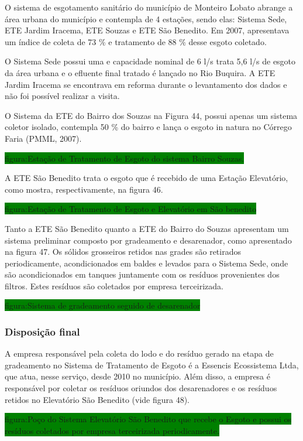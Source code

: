 	O sistema de esgotamento sanitário do município de Monteiro Lobato abrange a área urbana do município e contempla de 4 estações, sendo elas: Sistema Sede, ETE Jardim Iracema, ETE Souzas e ETE São Benedito. Em 2007, apresentava um índice de coleta de 73 \% e tratamento de 88 \% desse esgoto coletado. 

	O Sistema Sede possui uma e capacidade nominal de 6 l/s trata 5,6 l/s de esgoto da área urbana e o efluente final tratado é lançado no Rio Buquira. A ETE Jardim Iracema se encontrava em reforma durante o levantamento dos dados e não foi possível realizar a visita. 
	
	O Sistema da ETE do Bairro dos Souzas na Figura 44, possui apenas um sistema coletor isolado, contempla 50 \% do bairro e lança o esgoto in natura no Córrego Faria (PMML, 2007). 
	
	\colorbox{green}{figura:Estação de Tratamento de Esgoto do sistema Bairro Souzas.}
	
	A ETE São Benedito trata o esgoto que é recebido de uma Estação Elevatório, como mostra, respectivamente, na figura 46. 
	
	\colorbox{green}{figura:Estação de Tratamento de Esgoto e Elevatório em São benedito}
	
	Tanto a ETE São Benedito quanto a ETE do Bairro do Souzas apresentam um sistema preliminar composto por gradeamento e desarenador, como apresentado na figura 47. Os sólidos grosseiros retidos nas grades são retirados periodicamente, acondicionados em baldes e levados para o Sistema Sede, onde são acondicionados em tanques juntamente com os resíduos provenientes dos filtros. Estes resíduos são coletados por empresa terceirizada.
	
	\colorbox{green}{figura:Sistema de gradeamento seguido de desarenador}
	
	\subsubsection{Disposição final}
	
	A empresa responsável pela coleta do lodo e do resíduo gerado na etapa de gradeamento no Sistema de Tratamento de Esgoto é a Essencis Ecossistema Ltda, que atua, nesse serviço, desde 2010 no município. Além disso, a empresa é responsável por coletar os resíduos oriundos dos desarenadores e os resíduos retidos no Elevatório São Benedito (vide figura 48). 
	
	\colorbox{green}{figura:Poço do Sistema Elevatório São Benedito que recebe o Esgoto e possui os resíduos coletados por empresa terceirizada periodicamente.}
	
